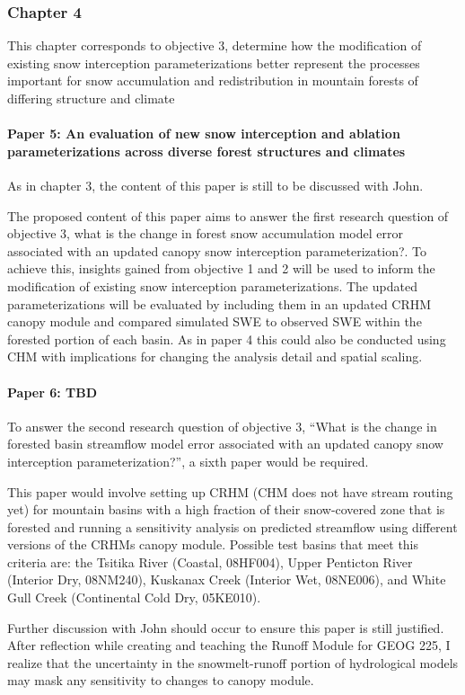 \documentclass[
  letterpaper,
  DIV=11,
  numbers=noendperiod]{scrartcl}
\let\oldparagraph\paragraph
\renewcommand{\paragraph}[1]{\oldparagraph{#1}\mbox{}}
\begin{document}
\subsubsection{Chapter 4}\label{chapter-4}

This chapter corresponds to objective 3, determine how the modification
of existing snow interception parameterizations better represent the
processes important for snow accumulation and redistribution in mountain
forests of differing structure and climate

\paragraph{Paper 5: An evaluation of new snow interception and ablation
parameterizations across diverse forest structures and
climates}\label{paper-5-an-evaluation-of-new-snow-interception-and-ablation-parameterizations-across-diverse-forest-structures-and-climates}

As in chapter 3, the content of this paper is still to be discussed with
John.

The proposed content of this paper aims to answer the first research
question of objective 3, what is the change in forest snow accumulation
model error associated with an updated canopy snow interception
parameterization?. To achieve this, insights gained from objective 1 and
2 will be used to inform the modification of existing snow interception
parameterizations. The updated parameterizations will be evaluated by
including them in an updated CRHM canopy module and compared simulated
SWE to observed SWE within the forested portion of each basin. As in
paper 4 this could also be conducted using CHM with implications for
changing the analysis detail and spatial scaling.

\paragraph{Paper 6: TBD}\label{paper-6-tbd}

To answer the second research question of objective 3, ``What is the
change in forested basin streamflow model error associated with an
updated canopy snow interception parameterization?'', a sixth paper
would be required.

This paper would involve setting up CRHM (CHM does not have stream
routing yet) for mountain basins with a high fraction of their
snow-covered zone that is forested and running a sensitivity analysis on
predicted streamflow using different versions of the CRHMs canopy
module. Possible test basins that meet this criteria are: the Tsitika
River (Coastal, 08HF004), Upper Penticton River (Interior Dry, 08NM240),
Kuskanax Creek (Interior Wet, 08NE006), and White Gull Creek
(Continental Cold Dry, 05KE010).

Further discussion with John should occur to ensure this paper is still
justified. After reflection while creating and teaching the Runoff
Module for GEOG 225, I realize that the uncertainty in the
snowmelt-runoff portion of hydrological models may mask any sensitivity
to changes to canopy module.
\end{document}
